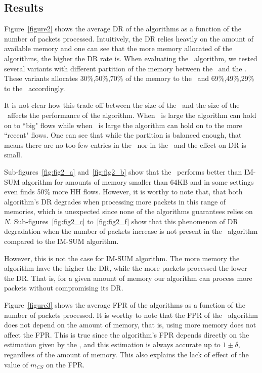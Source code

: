 \subsection{Results}



Figure~\ref{figure2} shows the average DR of the algorithms as a function of the number of packets processed. Intuitively, the DR relies heavily on the amount of available memory and one can see that the more memory allocated of the algorithms, the higher the DR rate is. When evaluating the \cs\ algorithm, we tested several variants with different partition of the memory between the \cs\ and the \sfa. These variants allocates 30\%,50\%,70\% of the memory to the \cs\ and 69\%,49\%,29\% to the \sfa\ accordingly.

It is not clear how this trade off between the size of the \cs\ and the size of the \sfa\ affects the performance of the algorithm. When \cs\ is large the algorithm can hold on to ``big" flows while when  \sfa\ is large the algorithm can hold on to the more ``recent" flows. One can see that while the partition is balanced enough, that means there are no too few entries in the \sfa\ nor in the \cs\ and the effect on DR is small.

Sub-figures~\ref{fig:fig2_a} and~\ref{fig:fig2_b} show that the \cs\ performs better than IM-SUM algorithm for amounts of memory smaller than 64KB and in some settings even finds 50\% more HH flows. However, it is worthy to note that, that both algorithm's DR degrades when processing more packets in this range of memories, which is unexpected since none of the algorithms guarantees relies on $N$.
Sub-figures~\ref{fig:fig2_c} to~\ref{fig:fig2_f} show that this phenomenon of DR degradation when the number of packets increase is not present in the \cs\ algorithm compared to the IM-SUM algorithm.

However, this is not the case for IM-SUM algorithm. The more memory the algorithm have the higher the DR, while the more packets processed the lower the DR. That is, for a given amount of memory our algorithm can process more packets without compromising its DR.

Figure~\ref{figure3} shows the average FPR of the algorithms as a function of the number of packets processed. It is worthy to note that the FPR of the \cs\ algorithm does not depend on the amount of memory, that is, using more memory does not affect the FPR. This is true since the algorithm's FPR depends directly on the estimation given by the \sea, and this estimation is always accurate up to $1\pm \delta$, regardless of the amount of memory. This also explains the lack of effect of the value of $m_{CS}$ on the FPR.

